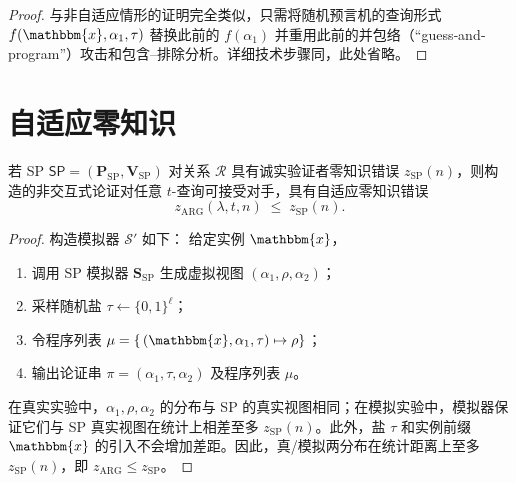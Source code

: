 \documentclass[american,singlepageview]{snargs-book-zh}
\newcommand{\Bits}{\{0,1\}}
\newcommand{\Relation}{\mathcal{R}}
\newcommand{\Instance}{\mathbbm{x}}
\newcommand{\InstanceSize}{n}
\newcommand{\ProtoProver}{P}
\newcommand{\ProtoVerifier}{V}
\newcommand{\ProtoSimulator}{S}
\newcommand{\ProtoZKError}{z}
\newcommand{\SPSymbol}{\mathsf{SP}}
\newcommand{\SPSubscript}{\scriptscriptstyle\mathrm{SP}}
\newcommand{\SPFormat}[1]{\mathbf{#1}}
\newcommand{\SPProver}{\SPFormat{\ProtoProver}_{\SPSubscript}}
\newcommand{\SPVerifier}{\SPFormat{\ProtoVerifier}_{\SPSubscript}}
\newcommand{\SPSimulator}{\SPFormat{\ProtoSimulator}_{\SPSubscript}}
\newcommand{\SPZKError}{\ProtoZKError_{\SPSubscript}}
\newcommand{\SPSystem}{(\SPProver,\SPVerifier)}
\newcommand{\SPCommitment}{\alpha_{1}}
\newcommand{\SPChallenge}{\rho}
\newcommand{\SPResponse}{\alpha_{2}}
\newcommand{\ARGSubscript}{\scriptscriptstyle\mathrm{ARG}}
\newcommand{\ARGFormat}[1]{\mathcal{#1}}
\newcommand{\ARGSimulator}{\ARGFormat{\ProtoSimulator}}
\newcommand{\ARGString}{\pi}
\newcommand{\ARGZKError}{\ProtoZKError_{\ARGSubscript}}
\newcommand{\ARGZKProgrammedList}{\ProgrammedList}
\newcommand{\ROFunction}{f}
\newcommand{\ROQueryBound}{t}
\newcommand{\SecurityParameter}{\lambda}
\newcommand{\ProgrammedList}{\mu}
\newcommand{\RandSalt}{\tau}
\newcommand{\SaltLength}{\ell}
\begin{document}
\begin{proof}
与非自适应情形的证明完全类似，只需将随机预言机的查询形式
\(\ROFunction(\Instance,\SPCommitment,\RandSalt)\)
替换此前的
\(\ROFunction(\SPCommitment)\)
并重用此前的并包络（“guess‐and‐program”）攻击和包含–排除分析。详细技术步骤同，此处省略。
\end{proof}


\section{自适应零知识}
\label{section:narg-from-sp-zero-knowledge}

\begin{lemma}
\label{lemma:narg-from-sp-zero-knowledge}
若 SP $\SPSymbol=\SPSystem$ 对关系 $\Relation$ 具有诚实验证者零知识错误 $\SPZKError(\InstanceSize)$，则构造的非交互式论证对任意 $\ROQueryBound$-查询可接受对手，具有自适应零知识错误
\[
  \ARGZKError(\SecurityParameter,\ROQueryBound,\InstanceSize)
  \;\le\;
  \SPZKError(\InstanceSize).
\]
\end{lemma}

\begin{proof}
构造模拟器 $\ARGSimulator'$ 如下：  
给定实例 $\Instance$，
\begin{enumerate}[nosep]
  \item 调用 SP 模拟器 $\SPSimulator$ 生成虚拟视图
    \((\SPCommitment,\SPChallenge,\SPResponse)\)；
  \item 采样随机盐 \(\RandSalt\gets\Bits^{\SaltLength}\)；
  \item 令程序列表
    \(\ARGZKProgrammedList=\{\,(\Instance,\SPCommitment,\RandSalt)\mapsto\SPChallenge\}\)；
  \item 输出论证串
    \(\ARGString=(\SPCommitment,\RandSalt,\SPResponse)\)
    及程序列表 \(\ARGZKProgrammedList\)。
\end{enumerate}
在真实实验中，\(\SPCommitment,\SPChallenge,\SPResponse\) 的分布与 SP 的真实视图相同；在模拟实验中，模拟器保证它们与 SP 真实视图在统计上相差至多 \(\SPZKError(\InstanceSize)\)。此外，盐 \(\RandSalt\) 和实例前缀 \(\Instance\) 的引入不会增加差距。因此，真/模拟两分布在统计距离上至多 \(\SPZKError(\InstanceSize)\)，即
\(\ARGZKError\le\SPZKError\)。  
\end{proof}


\end{document}
